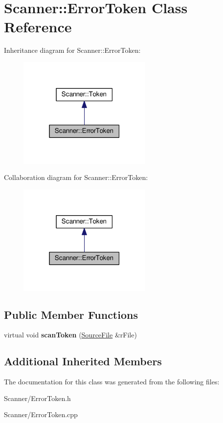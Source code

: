 \hypertarget{class_scanner_1_1_error_token}{}\section{Scanner\+:\+:Error\+Token Class Reference}
\label{class_scanner_1_1_error_token}


Inheritance diagram for Scanner\+:\+:Error\+Token\+:
\nopagebreak
\begin{figure}[H]
\begin{center}
\leavevmode
\includegraphics[width=187pt]{class_scanner_1_1_error_token__inherit__graph}
\end{center}
\end{figure}


Collaboration diagram for Scanner\+:\+:Error\+Token\+:
\nopagebreak
\begin{figure}[H]
\begin{center}
\leavevmode
\includegraphics[width=187pt]{class_scanner_1_1_error_token__coll__graph}
\end{center}
\end{figure}
\subsection*{Public Member Functions}
\begin{DoxyCompactItemize}
\item 
virtual void {\bfseries scan\+Token} (\hyperlink{class_scanner_1_1_source_file}{Source\+File} \&r\+File)\hypertarget{class_scanner_1_1_error_token_a71999afcaec23264d91e8bc152de00bd}{}\label{class_scanner_1_1_error_token_a71999afcaec23264d91e8bc152de00bd}

\end{DoxyCompactItemize}
\subsection*{Additional Inherited Members}


The documentation for this class was generated from the following files\+:\begin{DoxyCompactItemize}
\item 
Scanner/Error\+Token.\+h\item 
Scanner/Error\+Token.\+cpp\end{DoxyCompactItemize}
